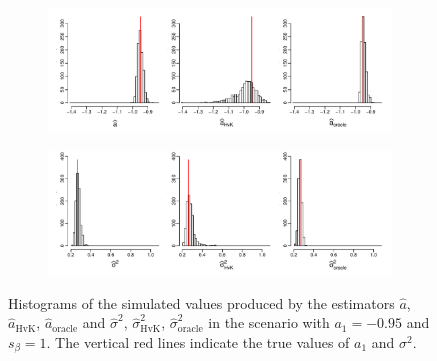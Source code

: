 \begin{figure}[t!]
\centering
\begin{subfigure}[b]{\textwidth}
\includegraphics[width=\textwidth]{Plots/a_hat_histograms_a1=-95_T=500_slope=1_(q,r,M1,M2)=(25,10,20,30).pdf}
\end{subfigure}
\begin{subfigure}[b]{\textwidth}
\includegraphics[width=\textwidth]{Plots/lrv_histograms_a1=-95_T=500_slope=1_(q,r,M1,M2)=(25,10,20,30).pdf}
\end{subfigure}
\caption{Histograms of the simulated values produced by the estimators $\widehat{a}$, $\widehat{a}_{\text{HvK}}$, $\widehat{a}_{\text{oracle}}$ and $\widehat{\sigma}^2$, $\widehat{\sigma}^2_{\text{HvK}}$, $\widehat{\sigma}^2_{\text{oracle}}$ in the scenario with $a_1 = -0.95$ and $s_\beta = 1$. The vertical red lines indicate the true values of $a_1$ and $\sigma^2$.}\label{fig:hist_scenario1} 
\end{figure}


